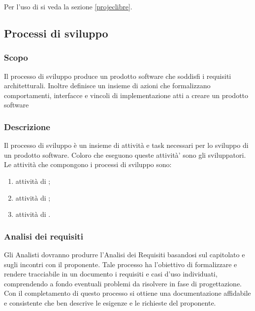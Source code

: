 \documentclass[12pt,a4paper]{article}
\begin{document}
Per l'uso di  si veda la sezione \ref{projeclibre}.

\subsection{Processi di sviluppo}

\subsubsection{Scopo}
Il processo di sviluppo produce un prodotto software che soddisfi i requisiti architetturali. Inoltre definisce un insieme di azioni che formalizzano comportamenti, interfacce e vincoli di implementazione atti a creare un prodotto software

\subsubsection{Descrizione}
Il processo di sviluppo è un insieme di attività e task necessari per lo sviluppo di un prodotto software. Coloro che eseguono queste attività' sono gli sviluppatori. Le attività che compongono i processi di sviluppo sono:
\begin{enumerate}
	\item attività di \FA;
	\item attività di \FPA;
	\item attività di \FPDC.
\end{enumerate}

\subsubsection{Analisi dei requisiti}
Gli Analisti dovranno produrre l'Analisi dei Requisiti basandosi sul capitolato e sugli incontri con il proponente. Tale processo ha l'obiettivo di formalizzare e rendere tracciabile in un documento i requisiti e casi d'uso individuati, comprendendo a fondo eventuali problemi da risolvere in fase di progettazione. Con il completamento di questo processo si ottiene una documentazione affidabile e consistente che ben descrive le esigenze e le richieste del proponente.
\end{document}
